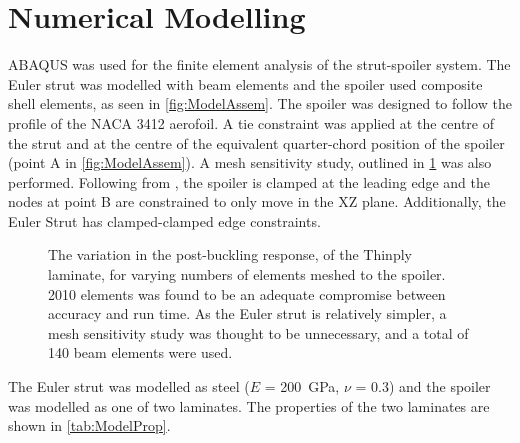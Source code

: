 \documentclass{IEEEtran}
\begin{document}
    \section{Numerical Modelling}
    ABAQUS was used for the finite element analysis of the strut-spoiler system. The Euler strut was modelled with beam elements and the spoiler used composite shell elements, as seen in \cref{fig:ModelAssem}. The spoiler was designed to follow the profile of the NACA 3412 aerofoil. 
    A tie constraint was applied at the centre of the strut and at the centre of the equivalent quarter-chord position of the spoiler (point A in \cref{fig:ModelAssem}). A mesh sensitivity study, outlined in \cref{fig:MeshSens} was also performed. Following from \cite{Wheatcroft_2023}, the spoiler is clamped at the leading edge and the nodes at point B are constrained to only move in the XZ plane. Additionally, the Euler Strut has clamped-clamped edge constraints. 

        \begin{figure}[!h]
        \footnotesize
        \centering
        
        \caption{ The variation in the post-buckling response, of the Thinply laminate, for varying numbers of elements meshed to the spoiler. 2010 elements was found to be an adequate compromise between accuracy and run time. As the Euler strut is relatively simpler, a mesh sensitivity study was thought to be unnecessary, and a total of 140 beam elements were used.}
        \label{fig:MeshSens}
    \end{figure}
    \normalfont
    The Euler strut was modelled as steel ($E$ = \SI{200}{GPa}, $\nu$ = \SI{0.3}{}) and the spoiler was modelled as one of two laminates.  The properties of the two laminates are shown in \cref{tab:ModelProp}.
    
\end{document}
